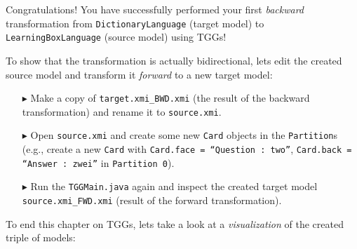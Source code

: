 Congratulations! You have successfully performed your first \emph{backward} transformation from \texttt{Dictionary\-Language} (target model) to \texttt{Learn\-ing\-Box\-Lan\-guage} (source model) using TGGs!

To show that the transformation is actually bidirectional, lets edit the created source model and transform it \emph{forward} to a new target model:

\begin{enumerate}
\item[$\blacktriangleright$] Make a copy of \texttt{target.xmi\_BWD.xmi} (the result of the backward transformation)
and rename it to \texttt{source.xmi}.
  
\item[$\blacktriangleright$] Open \texttt{source.xmi} and create some new \texttt{Card} objects in the \texttt{Partition}s (e.g., create a new \texttt{Card} with \texttt{Card.face = ``Question : two''}, \texttt{Card.back = ``Answer : zwei''} in \texttt{Partition 0}).

\item[$\blacktriangleright$] Run the \texttt{TGGMain.java} again and inspect the 
created target model \texttt{source.xmi\_FWD.xmi} (result of the forward transformation). 

\end{enumerate}

To end this chapter on TGGs, lets take a look at a \emph{visualization} of the created triple of models:


